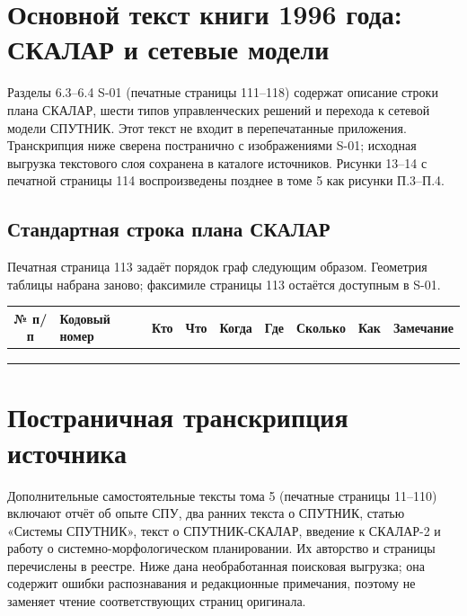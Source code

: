 \documentclass[12pt,a4paper]{article}
\begin{document}
\clearpage
\tableofcontents

\section{Основной текст книги 1996 года: СКАЛАР и сетевые модели}

Разделы 6.3--6.4 S-01 (печатные страницы 111--118) содержат описание строки плана СКАЛАР, шести типов управленческих решений и перехода к сетевой модели СПУТНИК. Этот текст не входит в перепечатанные приложения. Транскрипция ниже сверена постранично с изображениями S-01; исходная выгрузка текстового слоя сохранена в каталоге источников. Рисунки 13--14 с печатной страницы 114 воспроизведены позднее в томе 5 как рисунки П.3--П.4.

\begingroup
\footnotesize
{}
\endgroup

\subsection{Стандартная строка плана СКАЛАР}

Печатная страница 113 задаёт порядок граф следующим образом. Геометрия таблицы набрана заново; факсимиле страницы 113 остаётся доступным в S-01.

\footnotesize
\setlength{\tabcolsep}{2pt}
\begin{tabularx}{\linewidth}{|c|p{1.6cm}|c|X|X|X|X|X|X|}\hline
№ п/п&Кодовый номер&Кто&Что&Когда&Где&Сколько&Как&Замечание\\\hline
&&&&&&&&\\\hline
&&&&&&&&\\\hline
&&&&&&&&\\\hline
\end{tabularx}

\section{Постраничная транскрипция источника}

Дополнительные самостоятельные тексты тома 5 (печатные страницы 11--110) включают отчёт об опыте СПУ, два ранних текста о СПУТНИК, статью «Системы СПУТНИК», текст о СПУТНИК-СКАЛАР, введение к СКАЛАР-2 и работу о системно-морфологическом планировании. Их авторство и страницы перечислены в реестре. Ниже дана необработанная поисковая выгрузка; она содержит ошибки распознавания и редакционные примечания, поэтому не заменяет чтение соответствующих страниц оригинала.
\end{document}
